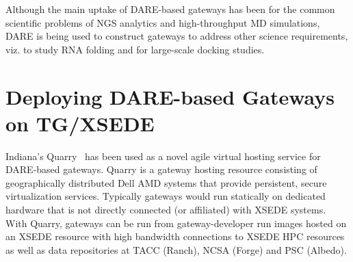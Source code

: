 \documentclass[]{svjour3}
\begin{document}

Although the main uptake of DARE-based gateways has been for the
common scientific problems of NGS analytics and high-throughput MD
simulations, DARE is being used to construct gateways to address other
science requirements, viz. to study RNA folding and for large-scale
docking studies.




\section{Deploying DARE-based Gateways on TG/XSEDE}

% 

Indiana's Quarry~\cite{quarry} has been used as a novel agile virtual hosting
service for DARE-based gateways. Quarry is a gateway hosting resource
consisting of
geographically distributed Dell AMD systems that provide persistent,
secure virtualization services. Typically gateways would run
statically on dedicated hardware that is not directly connected (or
affiliated) with XSEDE systems. With Quarry, gateways can be run from
gateway-developer run images hosted on an XSEDE resource with high
bandwidth connections to XSEDE HPC resources as well as data
repositories at TACC (Ranch), NCSA (Forge) and PSC (Albedo).
\end{document}
